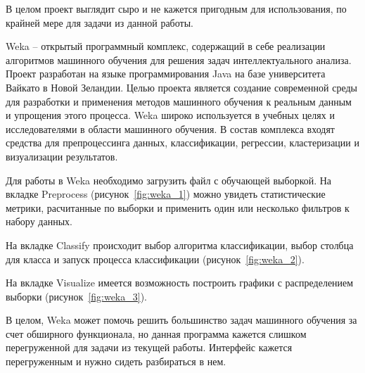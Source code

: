 



В целом проект выглядит сыро и не кажется пригодным для использования, по крайней мере для задачи из данной работы.


Weka -- открытый программный комплекс, содержащий в себе реализации алгоритмов машинного обучения для решения задач интеллектуального анализа. Проект разработан на языке программирования Java на базе университета Вайкато в Новой Зеландии. Целью проекта является создание современной среды для разработки и применения методов машинного обучения к реальным данным и упрощения этого процесса. Weka широко используется в учебных целях и исследователями в области машинного обучения. В состав комплекса входят средства для препроцессинга данных, классификации, регрессии, кластеризации и визуализации результатов\cite{weka1}.


Для работы в Weka необходимо загрузить файл с обучающей выборкой. На вкладке Preprocess (рисунок~\ref{fig:weka_1}) можно увидеть статистические метрики, расчитанные по выборки и применить один или несколько фильтров к набору данных.



На вкладке Classify происходит выбор алгоритма классификации, выбор столбца для класса и запуск процесса классификации (рисунок~\ref{fig:weka_2}).




На вкладке Visualize имеется возможность построить графики с распределением выборки (рисунок~\ref{fig:weka_3}).




В целом, Weka может помочь решить большинство задач машинного обучения за счет обширного функционала, но данная программа кажется слишком перегруженной для задачи из текущей работы. Интерфейс кажется перегруженным и нужно сидеть разбираться в нем.
